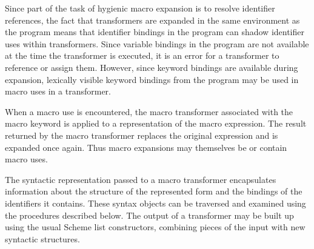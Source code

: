 Since part of the task of hygienic macro expansion is to resolve
identifier references, the fact that transformers are expanded in the
same environment as the program means that identifier bindings in the
program can shadow identifier uses within transformers.  Since
variable bindings in the program are not available at the time the
transformer is executed, it is an error for a transformer to reference
or assign them.  However, since keyword bindings are available during
expansion, lexically visible keyword bindings from the program may be
used in macro uses in a transformer.

When a macro use is encountered, the macro transformer associated with
the macro keyword is applied to a representation of the macro
expression.  The result returned by the macro transformer replaces the
original expression and is expanded once again.  Thus macro expansions
may themselves be or contain macro uses.

The syntactic representation passed to a macro transformer
encapsulates information about the structure of the represented form
and the bindings of the identifiers it contains.  These syntax objects
can be traversed and examined using the procedures described below.
The output of a transformer may be built up using the usual Scheme
list constructors, combining pieces of the input with new syntactic
structures.

